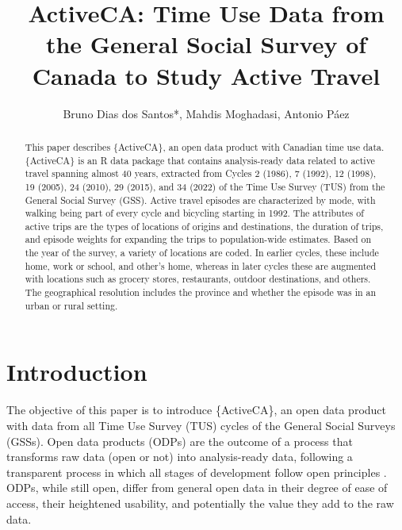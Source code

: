 \documentclass[Royal,times,sageh]{sagej}
\begin{document}

\title{ActiveCA: Time Use Data from the General Social Survey of Canada
to Study Active Travel}


\author{Bruno Dias dos Santos*, Mahdis
Moghadasi, Antonio Páez}




\begin{abstract}
This paper describes \{ActiveCA\}, an open data product with Canadian
time use data. \{ActiveCA\} is an R data package that contains
analysis-ready data related to active travel spanning almost 40 years,
extracted from Cycles 2 (1986), 7 (1992), 12 (1998), 19 (2005), 24
(2010), 29 (2015), and 34 (2022) of the Time Use Survey (TUS) from the
General Social Survey (GSS). Active travel episodes are characterized by
mode, with walking being part of every cycle and bicycling starting in
1992. The attributes of active trips are the types of locations of
origins and destinations, the duration of trips, and episode weights for
expanding the trips to population-wide estimates. Based on the year of
the survey, a variety of locations are coded. In earlier cycles, these
include home, work or school, and other's home, whereas in later cycles
these are augmented with locations such as grocery stores, restaurants,
outdoor destinations, and others. The geographical resolution includes
the province and whether the episode was in an urban or rural setting.
\end{abstract}


\maketitle

\section{Introduction}\label{introduction}

The objective of this paper is to introduce \{ActiveCA\}, an open data
product with data from all Time Use Survey (TUS) cycles of the General
Social Surveys (GSSs). Open data products (ODPs) are the outcome of a
process that transforms raw data (open or not) into analysis-ready data,
following a transparent process in which all stages of development
follow open principles \citep{arribas-bel2021}. ODPs, while still open,
differ from general open data in their degree of ease of access, their
heightened usability, and potentially the value they add to the raw
data.
\end{document}
